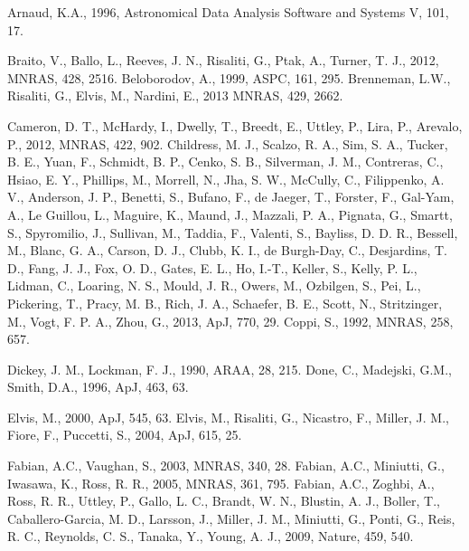 \documentclass[useAMS,usenatbib]{sam}
\begin{document}
\begin{thebibliography}{99}

      Arnaud, K.A., 1996, Astronomical Data Analysis Software and Systems V, 101, 17.

     Braito, V., Ballo, L., Reeves, J. N., Risaliti, G., Ptak, A., Turner, T. J., 2012, MNRAS, 428, 2516.
     Beloborodov, A., 1999, ASPC, 161, 295.
     Brenneman, L.W., Risaliti, G., Elvis, M., Nardini, E., 2013 MNRAS, 429, 2662.
    
     Cameron, D. T., McHardy, I., Dwelly, T., Breedt, E., Uttley, P., Lira, P., Arevalo, P., 2012, MNRAS,
422, 902.
     Childress, M. J., Scalzo, R. A., Sim, S. A., Tucker, B. E., Yuan, F., Schmidt, B. P., Cenko, S.
B., Silverman, J. M., Contreras, C., Hsiao, E. Y., Phillips, M., Morrell, N., Jha, S. W., McCully, C., Filippenko, A. V., Anderson, J. P., Benetti, S., Bufano, F., de
Jaeger, T., Forster, F., Gal-Yam, A., Le Guillou, L., Maguire, K., Maund, J., Mazzali, P. A., Pignata, G., Smartt, S., Spyromilio, J., Sullivan, M., Taddia, F.,
Valenti, S., Bayliss, D. D. R., Bessell, M., Blanc, G. A., Carson, D. J., Clubb, K. I., de Burgh-Day, C., Desjardins, T. D., Fang, J. J., Fox, O. D., Gates, E. L.,
Ho, I.-T., Keller, S., Kelly, P. L., Lidman, C., Loaring, N. S., Mould, J. R., Owers, M., Ozbilgen, S., Pei, L., Pickering, T., Pracy, M. B., Rich, J. A., Schaefer,
B. E., Scott, N., Stritzinger, M., Vogt, F. P. A., Zhou, G., 2013, ApJ, 770, 29.
     Coppi, S., 1992, MNRAS, 258, 657.
    
     Dickey, J. M., Lockman, F. J., 1990, ARAA, 28, 215.
     Done, C., Madejski, G.M., Smith, D.A., 1996, ApJ, 463, 63.
    
     Elvis, M., 2000, ApJ, 545, 63.
     Elvis, M., Risaliti, G., Nicastro, F., Miller, J. M., Fiore, F., Puccetti, S., 2004, ApJ, 615, 25.
    
     Fabian, A.C., Vaughan, S., 2003, MNRAS, 340, 28.
     Fabian, A.C., Miniutti, G., Iwasawa, K., Ross, R. R., 2005, MNRAS, 361, 795.
     Fabian, A.C., Zoghbi, A., Ross, R. R., Uttley, P., Gallo, L. C., Brandt, W. N., Blustin, A. J.,
Boller, T., Caballero-Garcia, M. D., Larsson, J., Miller, J. M., Miniutti, G., Ponti, G., Reis, R. C., Reynolds, C. S., Tanaka, Y., Young, A. J., 2009, Nature, 459,
540.
	

\end{thebibliography}
\end{document}
